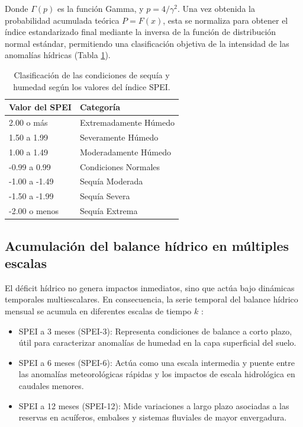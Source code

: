 Donde $\Gamma(p)$ es la función Gamma, y $p = 4/\gamma^2$. Una vez obtenida la probabilidad acumulada teórica $P = F(x)$, esta se normaliza para obtener el índice estandarizado final mediante la inversa de la función de distribución normal estándar, permitiendo una clasificación objetiva de la intensidad de las anomalías hídricas (Tabla \ref{tab:clasificacion_spei}).

\begin{table}[ht!]
\centering
\caption{Clasificación de las condiciones de sequía y humedad según los valores del índice SPEI.}
\label{tab:clasificacion_spei}
\vspace{-0.75cm}
\singlespacing %
\small         %
\begin{tabular}{p{5cm}p{4.5cm}}
\hline\hline
\textbf{Valor del SPEI} & \textbf{Categoría} \\ \hline
2.00 o más & Extremadamente Húmedo \\
1.50 a 1.99 & Severamente Húmedo \\
1.00 a 1.49 & Moderadamente Húmedo \\
-0.99 a 0.99 & Condiciones Normales \\
-1.00 a -1.49 & Sequía Moderada \\
-1.50 a -1.99 & Sequía Severa \\
-2.00 o menos & Sequía Extrema \\ \hline\hline
\end{tabular}
\end{table}

\subsection{Acumulación del balance hídrico en múltiples escalas}

El déficit hídrico no genera impactos inmediatos, sino que actúa bajo dinámicas temporales multiescalares. En consecuencia, la serie temporal del balance hídrico mensual se acumula en diferentes escalas de tiempo $k$ \cite{mckee1993}:
\begin{itemize}
    \item {SPEI a 3 meses (SPEI-3):} Representa condiciones de balance a corto plazo, útil para caracterizar anomalías de humedad en la capa superficial del suelo.
    \item {SPEI a 6 meses (SPEI-6):} Actúa como una escala intermedia y puente entre las anomalías meteorológicas rápidas y los impactos de escala hidrológica en caudales menores. 
    \item {SPEI a 12 meses (SPEI-12):} Mide variaciones a largo plazo asociadas a las reservas en acuíferos, embalses y sistemas fluviales de mayor envergadura.
\end{itemize}

